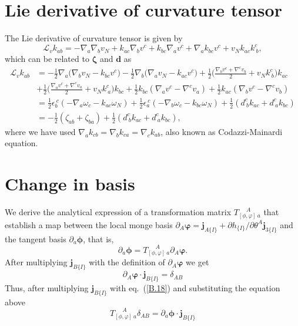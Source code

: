 \section{Lie derivative of curvature tensor} \label{curvature_tensor}
The Lie derivative of curvature tensor is given by \cite{capovilla2002, salbreux2017}
\begin{equation} \label{append_1_II}
	\mathcal{L}_v k_{ab} = -\nabla_a \nabla_b v_N + k_{ac} \nabla_b v^c + k_{bc}\nabla_a v^c + \nabla_a k_{bc}v^c + v_Nk_{ac}k^{c}_{~b},
\end{equation}
which can be related to $\bm{\zeta}$ and $\bm{d}$ as
\begin{align} \label{append_2_II}
	\mathcal{L}_v k_{ab}  & = -\frac{1}{2}\nabla_a \bigg(\nabla_b v_N -  k_{bc} v^c\bigg) - \frac{1}{2}\nabla_b \bigg(\nabla_a v_N -  k_{ac} v^c\bigg) + \frac{1}{2}\bigg( \frac{\nabla_b v^c + \nabla^c v_b}{2} + v_Nk_{~b}^c \bigg)k_{ac}   \nonumber \\ & + \frac{1}{2}\bigg( \frac{\nabla_a v^c +   \nabla^c v_a}{2} +v_N k^{c}_{~a} \bigg)k_{bc} + \frac{1}{2}k_{bc}(\nabla_a v^c -   \nabla^c v_a) +  \frac{1}{2}k_{ac}(\nabla_b v^c -   \nabla^c v_b) \nonumber \\ & =
	\frac{1}{2} \epsilon_{b}^{~c} (-\nabla_a \omega_c - k_{ac} \omega_N ) + \frac{1}{2} \epsilon_{a}^{~c} (-\nabla_b \omega_c - k_{bc}\omega_N) + \frac{1}{2}(d^c_{~b}k_{ac} +d^c_{~a}k_{bc})  \nonumber \\ & =-\frac{1}{2} \left(\zeta_{ab} +\zeta_{ba}\right)+ \frac{1}{2}\left(d^c_{~b}k_{ac} +d^c_{~a}k_{bc}\right),
\end{align}
where we have used $ \nabla_a k_{cb} = \nabla_b k_{ca}  = \nabla_c k_{ab}$, also known as Codazzi-Mainardi equation.
 \iffalse 
\section{Change in basis}
 We derive the analytical expression of a transformation matrix $T_{[\phi,\varphi]~a}^{\quad \,\, A}$ that establish a map between the local monge basis $\partial_A \bm{\varphi}= \bm{j}_{A\{I\}} + \partial h_{\{I\}}/\partial \theta^A \bm{j}_{3\{I\}}$ and the tangent basis $\partial_a \bm{\phi}$, that is,
 \begin{equation} \label{B.18}
\partial_a \bm{\phi} = T_{[\phi,\varphi]~a}^{\quad \,\, A} \partial_A \bm{\varphi}.
 \end{equation}
After multiplying $\bm{j}_{B\{I\}}$ with the definition of $\partial_A \bm{\varphi}$ we get
\begin{equation} \label{B.19}
 \partial_A \bm{\varphi} \cdot \bm{j}_{B\{I\}} = \delta_{AB}
\end{equation}
Thus, after multiplying $\bm{j}_{B\{I\}}$ with eq.~(\ref{B.18}) and  substituting the equation above
\begin{equation} \label{B.20}
T_{[\phi,\varphi]~a}^{\quad \,\, A} \delta_{AB}= 	\partial_a \bm{\phi} \cdot  \bm{j}_{B\{I\}}
\end{equation}


